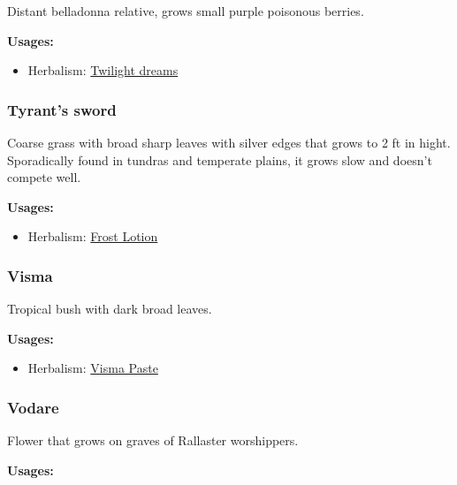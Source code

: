 Distant belladonna relative, grows small purple poisonous berries.

\vspace{5mm}

\textbf{Usages:}

\begin{itemize}[noitemsep]
\item[] Herbalism: \hyperref[Twilight dreams]{Twilight dreams}
\end{itemize}

\subsubsection{Tyrant's sword}
\label{Tyrant's Sword}

Coarse grass with broad sharp leaves with silver edges that grows to 2 ft in hight. Sporadically found in tundras and temperate plains, it grows slow and doesn't compete well.

\vspace{5mm}

\textbf{Usages:}

\begin{itemize}[noitemsep]
\item[] Herbalism: \hyperref[Frost Lotion]{Frost Lotion}
\end{itemize}

\subsubsection{Visma}
\label{Visma}

Tropical bush with dark broad leaves.

\vspace{5mm}

\textbf{Usages:}

\begin{itemize}[noitemsep]
\item[] Herbalism: \hyperref[Visma Paste]{Visma Paste}
\end{itemize}

\subsubsection{Vodare}
\label{Vodare}

Flower that grows on graves of Rallaster worshippers.

\vspace{5mm}

\textbf{Usages:}

